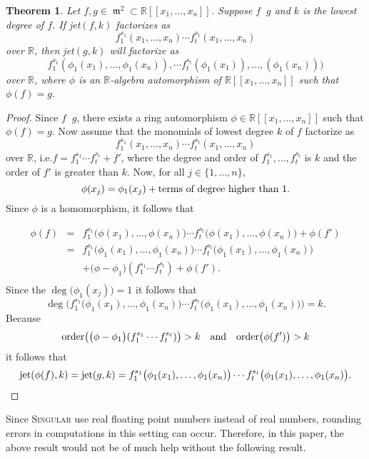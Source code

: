 \documentclass[noend]{amsproc}
\newtheorem{theorem}{Theorem}
\DeclareMathOperator{\requiv}{\overset{r}{\sim}}
\DeclareMathOperator{\m}{\mathfrak{m}}
\begin{document}
\begin{theorem}\label{kjet}
Let $f,g\in \m^2\subset\mathbb R[[x_1,\ldots,x_n]]$. Suppose $f\requiv g$
and $k$
is the lowest degree of $f$. If jet$(f,k)$ factorizes as
\[f_1^{s_1}(x_1,\ldots,x_n)\cdots f_t^{s_t}(x_1,\ldots,x_n)\]
over $\mathbb R$, then jet$(g,k)$ will factorize
as \[f_1^{s_1} (\phi_1(x_1),\ldots,\phi_1(x_n)),\cdots
f_t^{s_t}(\phi_1(x_1)),\ldots,(\phi_1(x_n)))\] over $\mathbb R$, where $\phi$
is an $\mathbb R$-algebra automorphism of $\mathbb R[[x_1,\ldots,x_n]]$
such that $\phi(f)=g$.
\end{theorem}
\begin{proof}
Since $f\requiv g$, there exists a ring automorphism $\phi\in\mathbb
R[[x_1,\ldots,x_n]]$ such that  $\phi(f)=g$. Now
assume that the monomials of lowest degree $k$ of $f$ factorize
as \[f_1^{s_1}(x_1,\ldots,x_n)\cdots f_t^{s_t}(x_1,\ldots,x_n)\] over
$\mathbb R$, i.e.\@ $f=f_1^{s_1}\cdots f_t^{s_t}+f'$, where the degree and
order of $f_1^{s_1},\ldots,f_t^{s_t}$ is $k$ and the order of $f'$ is greater
than $k$.  Now, for all $j\in\{1,\ldots,n\}$,
\[\phi(x_j)=\phi_1(x_j)+\textnormal{terms of degree higher than $1$}.\] Since
$\phi$ is a homomorphism, it follows that

\begin{eqnarray*}
\phi(f)&=&f_1^{s_1}\big(\phi(x_1),\ldots,\phi(x_n)\big)\cdots
f_t^{s_t}\big(\phi(x_1),\ldots,\phi(x_n)\big)+\phi(f')\\
&=&f_1^{s_1}\big(\phi_1(x_1),\ldots,\phi_1(x_n)\big)\cdots
f_t^{s_t}\big(\phi_1(x_1),\ldots,\phi_1(x_n)\big)\\
&&+\big(\phi-\phi_1\big)(f_1^{s_1}\cdots f_t^{s_t})+\phi(f').\\
\end{eqnarray*}
Since the $\deg\big(\phi_1(x_j))=1$ it follows that
\[\deg\big(f_1^{s_1}\big(\phi_1(x_1),\ldots,\phi_1(x_n)\big)\cdots
f_t^{s_t}\big(\phi_1(x_1),\ldots,\phi_1(x_n)\big)\big)=k.\] Because
\[
\textnormal{order}\big(\big(\phi-\phi_1\big)(f_1^{s_1}\cdots f_t^{s_t})\big)>k
\quad\textnormal{and}\quad\textnormal{order}\big(\phi(f')\big)>k
\]
it follows that
\begin{eqnarray*}
\textnormal{jet}(\phi(f),k)=\textnormal{jet}(g,k)
=f_1^{s_1}\big(\phi_1(x_1),\ldots,\phi_1(x_n)\big)\cdots
f_t^{s_t}\big(\phi_1(x_1),\ldots,\phi_1(x_n)\big).
\end{eqnarray*}
\end{proof}

Since \textsc{Singular} use real floating point numbers instead of real
numbers, rounding errors in computations in this setting can
occur. Therefore, in this paper, the above result would not be of much help
without the
following result.
\end{document}
